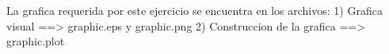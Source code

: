 La grafica requerida por este ejercicio se encuentra en los archivos:
    1) Grafica visual ==> graphic.eps y graphic.png
    2) Construccion de la grafica ==> graphic.plot